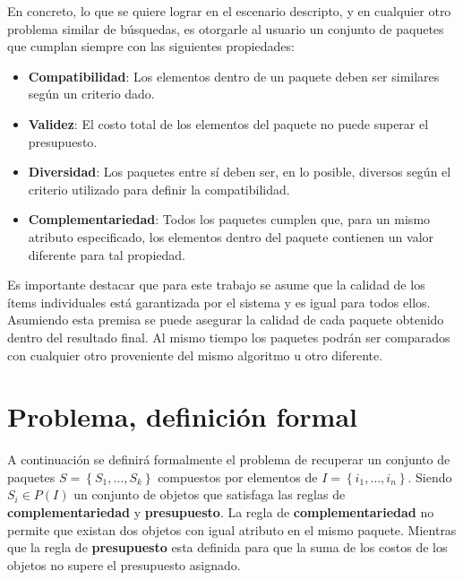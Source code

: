 En concreto, lo que se quiere lograr en el escenario descripto, y en cualquier otro problema similar de búsquedas, es otorgarle al usuario un conjunto de paquetes que cumplan siempre con las siguientes propiedades: 

\begin{itemize}
\item \textbf{Compatibilidad}: Los elementos dentro de un paquete deben ser similares según un criterio dado.
\item \textbf{Validez}: El costo total de los elementos del paquete no puede superar el presupuesto.
\item \textbf{Diversidad}: Los paquetes entre sí deben ser, en lo posible, diversos según el criterio utilizado para definir la compatibilidad.
\item \textbf{Complementariedad}: Todos los paquetes cumplen que, para un mismo atributo especificado, los elementos dentro del paquete contienen un valor diferente para tal propiedad.
\end{itemize}

Es importante destacar que para este trabajo se asume que la calidad de los ítems individuales está garantizada por el sistema y es igual para todos ellos. Asumiendo esta premisa se puede asegurar la calidad de cada paquete obtenido dentro del resultado final. Al mismo tiempo los paquetes podrán ser comparados con cualquier otro proveniente del mismo algoritmo u otro diferente.

\section{Problema, definición formal}\label{introduccion:problemaFormal}
A continuación se definirá formalmente el problema de recuperar un conjunto de paquetes $S = \left\{S_1, \ldots, S_k\right\}$ compuestos por elementos de $I=\left\{i_1,\ldots, i_n\right\}$. Siendo $S_i \in P(I)$ un conjunto de objetos que satisfaga las reglas de \textbf{complementariedad} y \textbf{presupuesto}. La regla de \textbf{complementariedad} no permite que existan dos objetos con igual atributo en el mismo paquete. Mientras que la regla de \textbf{presupuesto} esta definida para que la suma de los costos de los objetos no supere el presupuesto asignado.


